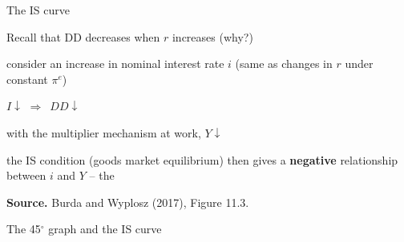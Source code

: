 \documentclass{beamer}
\newcommand{\tb}[1]{{\color{blue}{\textbf{#1}}}}
\newenvironment{mytemize}
{\vfill\itemize[nolistsep,itemsep=\fill,label=\color{blue}{$\triangleright$}]}
  {\enditemize}
\newcommand{\rarr}{$\Rightarrow$\ }
\begin{document}
\begin{frame}{The IS curve}

\begin{mytemize}
\item Recall that DD decreases when $r$ increases \textcolor{mint}{(why?)}
\item consider an increase in nominal interest rate $i$ (same as changes in $r$ under constant $\pi^e$)
\begin{mytemize}
    \item $I \downarrow$ \rarr $DD \downarrow$
    \item with the multiplier mechanism at work, $Y \downarrow$
\end{mytemize}
\item the IS condition (goods market equilibrium) then gives a \textbf{negative} relationship between $i$ and $Y$ -- the \tb{IS curve}
\end{mytemize}

\begin{center}

\begin{figure}[h!]
	
\end{figure}

\begin{minipage}{0.6\columnwidth}
\tiny	
\textbf{Source.} Burda and Wyplosz (2017), Figure 11.3.\\
\end{minipage}
\end{center}
\end{frame}
\begin{frame}{The 45$^\circ$ graph and the IS curve}


\end{frame}
\end{document}
